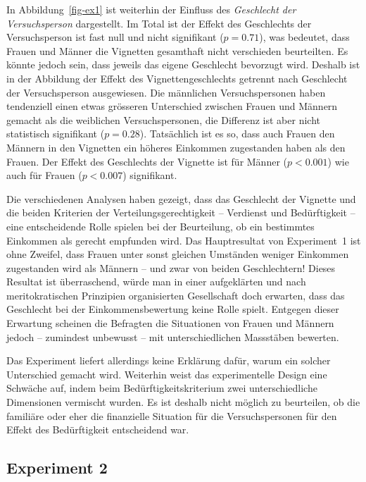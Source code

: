 \documentclass[a4paper,12pt]{article}
\renewcommand{\baselinestretch}{1.1}
\newif\ifcomments
\newcommand{\comment}[1]{%
    \ifcomments\marginpar{\renewcommand{\baselinestretch}{1}\tiny\hspace*{-1.1em}\colorbox{gray!20}%
    {\textcolor{red}{\parbox[t]{.9in}{\raggedright #1}}}}\fi}
\begin{document}
In Abbildung~\ref{fig-ex1} ist weiterhin der Einfluss des \emph{Geschlecht der
Versuchsperson} dargestellt. Im Total ist der Effekt des Geschlechts der
Versuchsperson ist fast null und nicht signifikant ($p=0.71$), was bedeutet,
dass Frauen und Männer die Vignetten gesamthaft nicht verschieden beurteilten.
Es könnte jedoch sein, dass jeweils das eigene Geschlecht bevorzugt wird.
Deshalb ist in der Abbildung der Effekt des Vignettengeschlechts getrennt nach
Geschlecht der Versuchsperson ausgewiesen. Die männlichen Versuchspersonen
haben tendenziell einen etwas grösseren Unterschied zwischen Frauen und Männern
gemacht als die weiblichen Versuchspersonen, die Differenz ist aber nicht
statistisch signifikant ($p=0.28$). Tatsächlich ist es so, dass auch Frauen
den Männern in den Vignetten ein höheres Einkommen zugestanden haben als den
Frauen. Der Effekt des Geschlechts der Vignette ist für Männer ($p<0.001$) 
wie auch für Frauen ($p<0.007$) signifikant.

Die verschiedenen Analysen haben gezeigt, dass das Geschlecht der Vignette und
die beiden Kriterien der Verteilungsgerechtigkeit -- Verdienst und
Bedürftigkeit -- eine entscheidende Rolle spielen bei der Beurteilung, ob ein
bestimmtes Einkommen als gerecht empfunden wird. Das Hauptresultat von
Experiment~1 ist ohne Zweifel, dass Frauen unter sonst gleichen Umständen
weniger Einkommen zugestanden wird als Männern -- und zwar von beiden
Geschlechtern! Dieses Resultat ist überraschend, würde man in einer
aufgeklärten und nach meritokratischen Prinzipien organisierten Gesellschaft
doch erwarten, dass das Geschlecht bei der Einkommensbewertung keine Rolle
spielt. Entgegen dieser Erwartung scheinen die Befragten die Situationen von
Frauen und Männern jedoch -- zumindest unbewusst -- mit unterschiedlichen
Massstäben bewerten.

Das Experiment liefert allerdings keine Erklärung dafür, warum ein solcher
Unterschied gemacht wird. Weiterhin weist das experimentelle Design eine
Schwäche auf, indem beim Bedürftigkeitskriterium zwei unterschiedliche
Dimensionen vermischt wurden. Es ist deshalb nicht möglich zu beurteilen, ob
die familiäre oder eher die finanzielle Situation für die Versuchspersonen für den 
Effekt des Bedürftigkeit entscheidend war.


\subsection{Experiment 2}
\comment{Teile der Beschreibung der Daten könnten in den Abschnitt „Daten und Methode“}
\comment{Doku der Daten erstellen}
\end{document}
